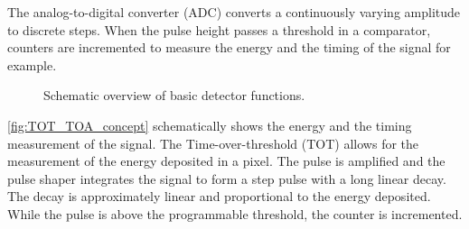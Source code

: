 The analog-to-digital converter (ADC) converts a continuously varying
amplitude to discrete steps. When the pulse height passes a threshold
in a comparator, counters are incremented to measure the energy and
the timing of the signal for example.

\begin{figure}[htbp]
  \centering
  \caption{Schematic overview of basic detector functions.}  
  \label{fig:detectorFunctions}
\end{figure}

\cref{fig:TOT_TOA_concept} schematically shows the energy and the
timing measurement of the signal. The Time-over-threshold (TOT) allows
for the measurement of the energy deposited in a pixel. The pulse is
amplified and the pulse shaper integrates the signal to form a step
pulse with a long linear decay. The decay is approximately linear and
proportional to the energy deposited. While the pulse is above the
programmable threshold, the counter is incremented.

